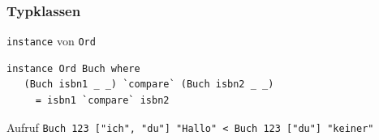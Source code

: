 \documentclass[fleqn,11pt,aspectratio=43]{beamer}
\begin{document}
\begin{frame}[fragile]
\frametitle{Typklassen}
\begin{block}{\lstinline|instance| von \lstinline|Ord|}
\begin{lstlisting}
instance Ord Buch where
   (Buch isbn1 _ _) `compare` (Buch isbn2 _ _) 
     = isbn1 `compare` isbn2
\end{lstlisting}
\end{block}
\begin{block}{Aufruf}
\lstinline|Buch 123 ["ich", "du"] "Hallo" < Buch 123 ["du"] "keiner"|
\end{block}
\end{frame}



\end{document}

